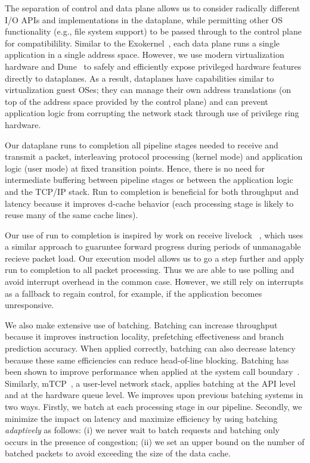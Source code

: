 The separation of control and data plane allows us to consider radically
different I/O APIs and implementations in the dataplane, while
permitting other OS functionality (e.g., file system
support) to be passed through to the control plane for compatibilility.
Similar to the
Exokernel~\cite{DBLP:conf/sosp/EnglerKO95}, each data plane runs a
single application in a single address space. However,
we use modern virtualization hardware and Dune~\cite{dune} to
safely and efficiently expose privileged hardware features directly to
dataplanes. As a result, dataplanes have capabilities similar to
virtualization guest OSes; they can manage
their own address translations (on top of the address space provided by
the control plane) and can prevent application logic from corrupting
the network stack through use of privilege ring hardware.



 Our dataplane
runs to completion all pipeline stages needed to receive and transmit a
packet, interleaving protocol processing (kernel mode) and application
logic (user mode) at fixed transition points. Hence, there is no need for intermediate
buffering between pipeline stages or between the application logic and
the TCP/IP stack. Run to completion is beneficial for both throughput
and latency because it improves d-cache behavior (each processing stage
is likely to reuse many of the same cache lines).

Our use of run to completion is inspired by work on receive livelock
~\cite{receive-livelock}, which uses a similar approach
to guaruntee forward progress during periods of unmanagable recieve packet load.
Our execution model allows us to go a step further and apply run to completion to
all packet processing. Thus we are able to use polling and avoid interrupt overhead
in the common case. However, we still rely on interrupts as a fallback to regain control,
for example, if the application becomes unresponsive.

We also make extensive use of batching. Batching can increase throughput because it
improves instruction locality, prefetching effectiveness and branch prediction accuracy.
When applied correctly, batching can also
decrease latency because these same efficiencies can reduce head-of-line blocking.
Batching has been shown to improve performance when applied at the system call
boundary~\cite{DBLP:conf/osdi/HanMCR12, DBLP:conf/osdi/SoaresS10}. Similarly,
mTCP~\cite{jeong2014mtcp}, a user-level network stack, applies batching
at the API level and at the hardware queue level.
We improves upon previous batching systems in two ways.
Firstly, we batch at each processing stage in our pipeline. Secondly, we
minimize the impact on latency and maximize efficiency by using batching
\emph{adaptively} as follows: (i) we never wait to batch requests and batching
only occurs in the presence of congestion; (ii) we set an upper bound on
the number of batched packets to avoid exceeding the size of the data cache.

